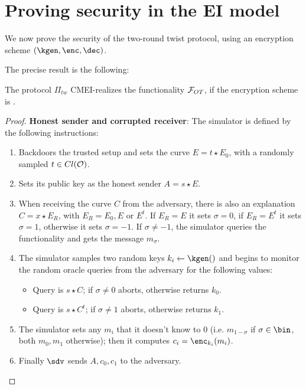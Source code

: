 \section{Proving security in the EI model}
We now prove the security of the two-round twist protocol, using an encryption scheme $(\kgen, \enc, \dec)$.

The precise result is the following:

\begin{theorem}
    The protocol $\Pi_{tw}$ CMEI-realizes the functionality $\mathcal{F}_{OT}$, if the encryption scheme is \indcpa.
\end{theorem}
\begin{proof}
    \textbf{Honest sender and corrupted receiver}: The simulator is defined by the following instructions:
    \begin{enumerate}
        \item Backdoors the trusted setup and sets the curve $E=t\star E_0$, with a randomly sampled $t\in Cl(\mathcal{O})$.
        \item Sets its public key as the honest sender $A=s\star E$.
        \item When receiving the curve $C$ from the adversary, there is also an explanation $C=x\star E_R$, with $E_R=E_0,E$ or $E^t$. If $E_R=E$ it sets $\sigma=0$, if $E_R=E^t$ it sets $\sigma=1$, otherwise it sets $\sigma=-1$. If $\sigma\neq -1$, the simulator queries the functionality and gets the message $m_\sigma$.
        \item The simulator samples two random keys $k_i\xleftarrow{}\kgen()$ and begins to monitor the random oracle queries from the adversary for the following values:
        \begin{itemize}
            \item Query is $s\star C$; if $\sigma\neq0$ aborts, otherwise returns $k_0$.
            \item Query is $s\star C^t$; if $\sigma\neq1$ aborts, otherwise returns $k_1$.
        \end{itemize}
        \item The simulator sets any $m_i$ that it doesn't know to $0$ (i.e. $m_{1-\sigma}$ if $\sigma\in\bin$, both $m_0,m_1$ otherwise); then it computes $c_i=\enc_{k_i}(m_i)$.
        \item Finally $\sdv$ sends $A,c_0,c_1$ to the adversary.
    \end{enumerate}
    

\end{proof}
